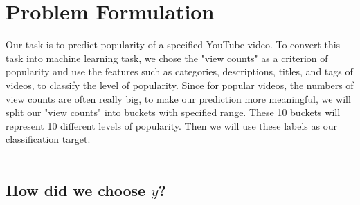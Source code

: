 \documentclass[english]{article}
\begin{document}
\section{Problem Formulation}
\begin{enumerate}
    Our task is to predict popularity of a specified YouTube video. To convert this task into machine learning task, we chose the "view counts" as a criterion of popularity and use the features such as categories, descriptions, titles, and tags of videos, to classify the level of popularity. Since for popular videos, the numbers of view counts are often really big, to make our prediction more meaningful, we will split our "view counts" into buckets with specified range. These 10 buckets will represent 10 different levels of popularity. Then we will use these labels as our classification target.\\ \\
    \subsection{How did we choose $y$?}


\end{enumerate}
\end{document}

